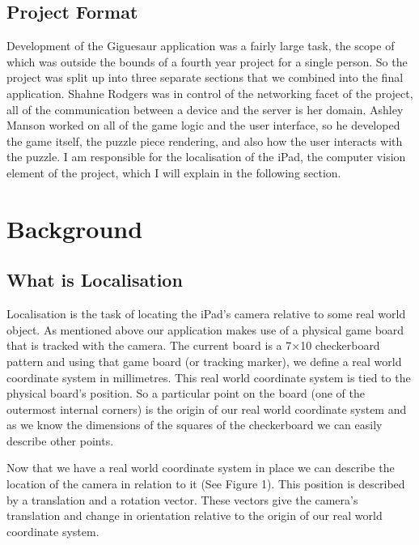 \documentclass{article}
\begin{document}
\subsection{Project Format}

Development of the Giguesaur application was a fairly large task, the scope of which was outside the bounds of a fourth year project for a single person. So the project was split up into three separate sections that we combined into the final application. Shahne Rodgers was in control of the networking facet of the project, all of the communication between a device and the server is her domain. Ashley Manson worked on all of the game logic and the user interface, so he developed the game itself, the puzzle piece rendering, and also how the user interacts with the puzzle. I am responsible for the localisation of the iPad, the computer vision element of the project, which I will explain in the following section. 


\section{Background}
\subsection{What is Localisation}

Localisation is the task of locating the iPad's camera relative to some real world object. As mentioned above our application makes use of a physical game board that is tracked with the camera. The current board is a 7$\times$10 checkerboard pattern and using that game board (or tracking marker), we define a real world coordinate system in millimetres. This real world coordinate system is tied to the physical board's position. So a particular point on the board (one of the outermost internal corners) is the origin of our real world coordinate system and as we know the dimensions of the squares of the checkerboard we can easily describe other points. \par

Now that we have a real world coordinate system in place we can describe the location of the camera in relation to it (See Figure 1). This position is described by a translation and a rotation vector. These vectors give the camera's translation and change in orientation relative to the origin of our real world coordinate system.\par 

\end{document}
